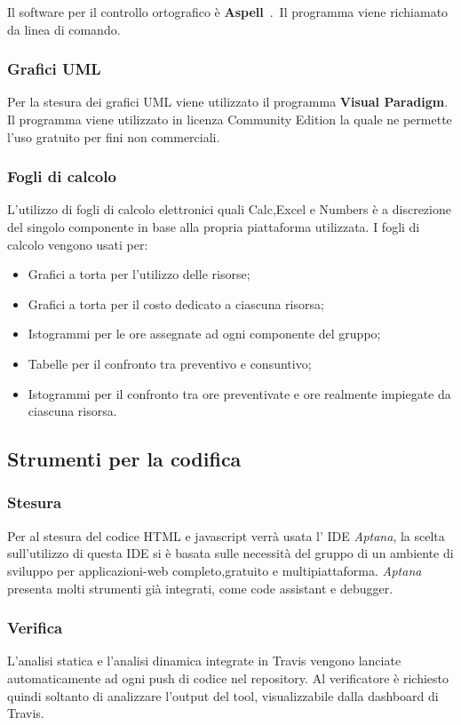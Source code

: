 Il software per il controllo ortografico è \textbf{Aspell}\ .\ Il programma viene richiamato da linea di comando.


\subsubsection{Grafici UML} 

Per la stesura dei grafici UML viene utilizzato il programma \textbf{Visual Paradigm}. Il programma viene utilizzato in licenza Community Edition la quale ne permette l’uso gratuito per fini non commerciali.

\subsubsection{Fogli di calcolo}
\label{sec:fogliDiCalcolo}
L'utilizzo di fogli di calcolo elettronici quali Calc,Excel e Numbers è a discrezione del singolo componente in base alla propria piattaforma utilizzata.
I fogli di calcolo vengono usati per:
\begin{itemize}
\item Grafici a torta per l'utilizzo delle risorse;
\item Grafici a torta per il costo dedicato a ciascuna risorsa;
\item Istogrammi per le ore assegnate ad ogni componente del gruppo;
\item Tabelle per il confronto tra preventivo e consuntivo;
\item Istogrammi per il confronto tra ore preventivate e ore realmente impiegate da
ciascuna risorsa.
\end{itemize}

\subsection{Strumenti per la codifica}
\label{sec:strumentiCodifica}
\subsubsection{Stesura}
Per al stesura del codice HTML e javascript verrà usata l' IDE \emph{Aptana}, la scelta sull'utilizzo di questa IDE si è basata sulle necessità del gruppo di un ambiente di sviluppo per applicazioni-web completo,gratuito e multipiattaforma.
\emph{Aptana} presenta molti strumenti già integrati, come code assistant e debugger. 
\subsubsection{Verifica}
L’analisi statica e l’analisi dinamica integrate in Travis vengono lanciate automaticamente ad ogni push di codice nel repository. Al verificatore è richiesto quindi soltanto di analizzare l’output del tool, visualizzabile dalla dashboard di Travis.




